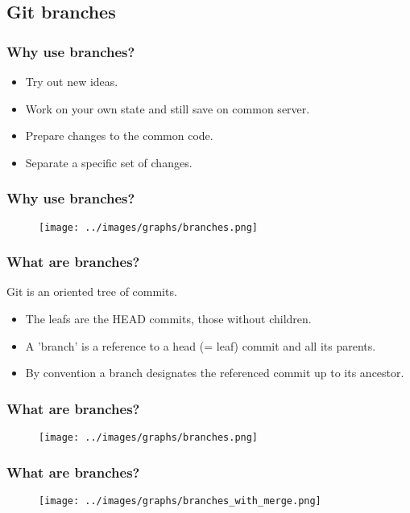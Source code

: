 \subsection{Git branches}

\begin{frame}
\frametitle{Why use branches?}
   \begin{itemize}
      \item<1-> Try out new ideas.
      \item<2-> Work on your own state and still save on common server.
      \item<3-> Prepare changes to the common code.
      \item<4-> Separate a specific set of changes.
   \end{itemize}
\end{frame}

\begin{frame}
\frametitle{Why use branches?}
   \begin{figure}
      \centering
      \texttt{[image: ../images/graphs/branches.png]}
   \end{figure}
\end{frame}

\begin{frame}
\frametitle{What are branches?}
   Git is an oriented tree of commits.
   \begin{itemize}
      \item The leafs are the HEAD commits, those without children.
      \item A 'branch' is a reference to a head (= leaf) commit and all its parents.
      \item By convention a branch designates the referenced commit up to its ancestor.
   \end{itemize}
\end{frame}

\begin{frame}
\frametitle{What are branches?}
   \begin{figure}
      \centering
      \texttt{[image: ../images/graphs/branches.png]}
   \end{figure}
\end{frame}

\begin{frame}
\frametitle{What are branches?}
   \begin{figure}
      \centering
      \texttt{[image: ../images/graphs/branches\_with\_merge.png]}
   \end{figure}
\end{frame}

